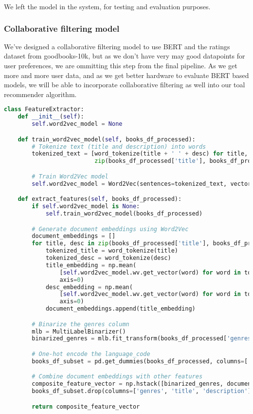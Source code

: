 We left the model in the system, for testing and evaluation purposes.

\subsubsection*{Collaborative filtering model}
We've designed a collaborative filtering model to use BERT and the ratings dataset from goodbooks-10k, but as we don't have very may good datapoints for user preferences, we are ommitting this step from the final pipeline. As we get more and more user data, and as we get better hardware to evaluate BERT based models, we will be able to incorporate collaborative filtering as well into our toal recommender algorithm.

\begin{lstlisting}[language=Python, caption={Feature Extraction using traditional Word2Vec}, label={lst:example}, linewidth=\linewidth, breaklines=true]
    class FeatureExtractor:
    def __init__(self):
        self.word2vec_model = None

    def train_word2vec_model(self, books_df_processed):
        # Tokenize text (title and description) into words
        tokenized_text = [word_tokenize(title + ' ' + desc) for title, desc in
                          zip(books_df_processed['title'], books_df_processed['description'])]

        # Train Word2Vec model
        self.word2vec_model = Word2Vec(sentences=tokenized_text, vector_size=100, window=5, min_count=1, workers=4)

    def extract_features(self, books_df_processed):
        if self.word2vec_model is None:
            self.train_word2vec_model(books_df_processed)

        # Generate document embeddings using Word2Vec
        document_embeddings = []
        for title, desc in zip(books_df_processed['title'], books_df_processed['description']):
            tokenized_title = word_tokenize(title)
            tokenized_desc = word_tokenize(desc)
            title_embedding = np.mean(
                [self.word2vec_model.wv.get_vector(word) for word in tokenized_title if word in self.word2vec_model.wv],
                axis=0)
            desc_embedding = np.mean(
                [self.word2vec_model.wv.get_vector(word) for word in tokenized_desc if word in self.word2vec_model.wv],
                axis=0)
            document_embeddings.append(title_embedding)

        # Binarize the genres column
        mlb = MultiLabelBinarizer()
        binarized_genres = mlb.fit_transform(books_df_processed['genres'])

        # One-hot encode the language_code
        books_df_subset = pd.get_dummies(books_df_processed, columns=['language_code'])

        # Combine document embeddings with other features
        composite_feature_vector = np.hstack([binarized_genres, document_embeddings,
        books_df_subset.drop(columns=['genres', 'title', 'description']).values])

        return composite_feature_vector
\end{lstlisting}

